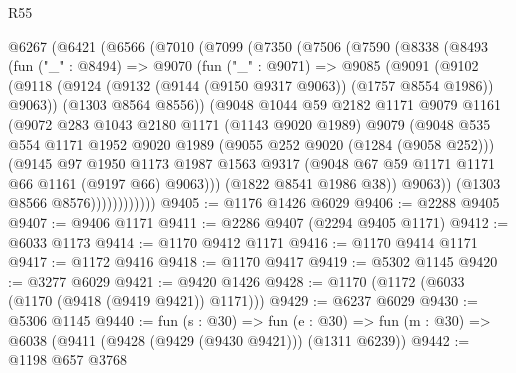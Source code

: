 \begin{lexlean}{R55}
\begin{coremodule}
  @6267
    (@6421
      (@6566
        (@7010
          (@7099
            (@7350
              (@7506
                (@7590
                  (@8338
                    (@8493
                      (fun ("_" : @8494) =>
                      @9070
                        (fun ("_" : @9071) =>
                        @9085
                          (@9091
                            (@9102
                              (@9118
                                (@9124
                                  (@9132 (@9144 (@9150 @9317 @9063)) (@1757 @8554 @1986))
                                  @9063))
                              (@1303 @8564 @8556))
                            (@9048
                              @1044
                              @59
                              @2182
                              @1171
                              @9079
                              @1161
                              (@9072
                                @283
                                @1043
                                @2180
                                @1171
                                (@1143 @9020 @1989)
                                @9079
                                (@9048
                                  @535
                                  @554
                                  @1171
                                  @1952
                                  @9020
                                  @1989
                                  (@9055 @252 @9020 (@1284 (@9058 @252)))
                                  (@9145
                                    @97
                                    @1950
                                    @1173
                                    @1987
                                    @1563
                                    @9317
                                    (@9048 @67 @59 @1171 @1171 @66 @1161 (@9197 @66) @9063)))
                                (@1822 @8541 @1986 @38))
                              @9063))
                          (@1303 @8566 @8576))))))))))))
@9405 := @1176 @1426 @6029
@9406 := @2288 @9405
@9407 := @9406 @1171
@9411 := @2286 @9407 (@2294 @9405 @1171)
@9412 := @6033 @1173
@9414 := @1170 @9412 @1171
@9416 := @1170 @9414 @1171
@9417 := @1172 @9416
@9418 := @1170 @9417
@9419 := @5302 @1145
@9420 := @3277 @6029
@9421 := @9420 @1426
@9428 := @1170 (@1172 (@6033 (@1170 (@9418 (@9419 @9421)) @1171)))
@9429 := @6237 @6029
@9430 := @5306 @1145
@9440 := fun (s : @30) =>
  fun (e : @30) => fun (m : @30) => @6038 (@9411 (@9428 (@9429 (@9430 @9421))) (@1311 @6239))
@9442 := @1198 @657 @3768

\end{coremodule}
\end{lexlean}
